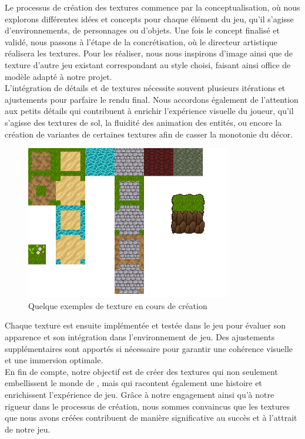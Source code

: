 Le processus de création des textures commence par la conceptualisation, où nous explorons différentes idées et concepts pour chaque élément du jeu, qu'il s'agisse d'environnements, de personnages ou d'objets.
Une fois le concept finalisé et validé, nous passons à l'étape de la concrétisation, où le directeur artistique réalisera les textures.
Pour les réaliser, nous nous inspirons d'image ainsi que de texture d'autre jeu existant correspondant au style choisi, faisant ainsi office de modèle adapté à notre projet.
\\

L'intégration de détails et de textures nécessite souvent plusieurs itérations et ajustements pour parfaire le rendu final.
Nous accordons également de l'attention aux petits détails qui contribuent à enrichir l'expérience visuelle du joueur, qu'il s'agisse des textures de sol, la fluidité des animation des entités, ou encore la création de variantes de certaines textures afin de casser la monotonie du décor.

\begin{figure}[H]
    \centering
    \includegraphics[width=0.8\textwidth]{2.game/assets/design3.png}
    \caption{Quelque exemples de texture en cours de création}
    \label{fig:design3}
\end{figure}

Chaque texture est ensuite implémentée et testée dans le jeu pour évaluer son apparence et son intégration dans l'environnement de jeu. Des ajustements supplémentaires sont apportés si nécessaire pour garantir une cohérence visuelle et une immersion optimale.
\\

En fin de compte, notre objectif est de créer des textures qui non seulement embellissent le monde de \gameName, mais qui racontent également une histoire et enrichissent l'expérience de jeu.
Grâce à notre engagement ainsi qu'à notre rigueur dans le processus de création, nous sommes convaincus que les textures que nous avons créées contribuent de manière significative au succès et à l'attrait de notre jeu.

